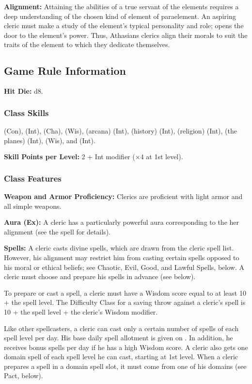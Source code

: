 \textbf{Alignment:} Attaining the abilities of a true servant of the elements requires a deep understanding of the chosen kind of element of paraelement. An aspiring cleric must make a study of the element's typical personality and role; opens the door to the element's power. Thus, Athasians clerics align their morals to suit the traits of the element to which they dedicate themselves.

\subsection{Game Rule Information}

\textbf{Hit Die:} d8.

\subsubsection{Class Skills}
 (Con),  (Int),  (Cha),  (Wis),  (arcana) (Int),  (history) (Int),  (religion) (Int),  (the planes) (Int),  (Wis), and  (Int).

\textbf{Skill Points per Level:} 2 + Int modifier ($\times4$ at 1st level).

\subsubsection{Class Features}
\textbf{Weapon and Armor Proficiency:} Clerics are proficient with light armor and all simple weapons.

\textbf{Aura (Ex):} A cleric has a particularly powerful aura corresponding to the her alignment (see the  spell for details).

\textbf{Spells:} A cleric casts divine spells, which are drawn from the cleric spell list. However, his alignment may restrict him from casting certain spells opposed to his moral or ethical beliefs; see Chaotic, Evil, Good, and Lawful Spells, below. A cleric must choose and prepare his spells in advance (see below).

To prepare or cast a spell, a cleric must have a Wisdom score equal to at least 10 + the spell level. The Difficulty Class for a saving throw against a cleric's spell is 10 + the spell level + the cleric's Wisdom modifier.

Like other spellcasters, a cleric can cast only a certain number of spells of each spell level per day. His base daily spell allotment is given on . In addition, he receives bonus spells per day if he has a high Wisdom score. A cleric also gets one domain spell of each spell level he can cast, starting at 1st level. When a cleric prepares a spell in a domain spell slot, it must come from one of his domains (see Pact, below).

